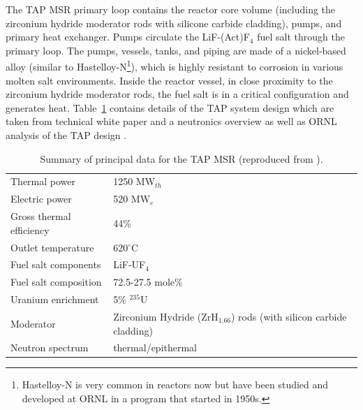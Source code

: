 \documentclass{anstrans}
\begin{document}
The \gls{TAP} \gls{MSR} primary loop contains the reactor core volume 
(including 
the zirconium hydride moderator rods with silicone carbide cladding), pumps, 
and 
primary heat exchanger. Pumps circulate the LiF-(Act)F$_4$ 
fuel salt through the primary loop. The pumps, vessels, tanks, and piping are 
made of a nickel-based alloy (similar to Hastelloy-N\footnote{ Hastelloy-N  
is 	very common in reactors now but have been studied and developed at  
\gls{ORNL} in a program that started in 1950s.}), which is highly resistant to 
corrosion in various molten salt environments. Inside the reactor vessel, in 
close proximity to the zirconium hydride moderator rods, the fuel salt is in a 
critical configuration and generates heat. Table~\ref{tab:tap_tab} contains 
details of the \gls{TAP} system design which are taken from technical white 
paper \cite{transatomic_power_corporation_technical_2016} and a neutronics 
overview \cite{transatomic_power_corporation_neutronics_2016} as well as 
\gls{ORNL} analysis of the \gls{TAP} design 
\cite{betzler_two-dimensional_2016, betzler_assessment_2017}. 
\begin{table}[h!]
	\caption{Summary of principal data for the \gls{TAP} \gls{MSR} 
		(reproduced from \cite{transatomic_power_corporation_technical_2016, 
		betzler_assessment_2017}). }
	\begin{tabularx}{\linewidth}{ X  X}
		\hline
		Thermal power				           		& 1250 MW$_{th}  $       
		\\ 
		Electric power		                		& 520 MW$_e  $ 			 
		\\ 
		Gross thermal efficiency        			& 44\%     				 
		\\  
		Outlet temperature							& 620$^{\circ}$C         
		\\ 
		Fuel salt components                   & LiF-UF$_4$				 \\  
		Fuel salt composition                  & 72.5-27.5 mole\%			 
		\\  
		Uranium enrichment                     & 5\% $^{235}$U          	 \\
		Moderator                              & Zirconium Hydride 
		(ZrH$_{1.66}$) rods (with silicon carbide cladding) \\
		Neutron spectrum						& 
		thermal/epithermal                 \\
		\hline
	\end{tabularx}
	\label{tab:tap_tab}
\end{table}
\end{document}
